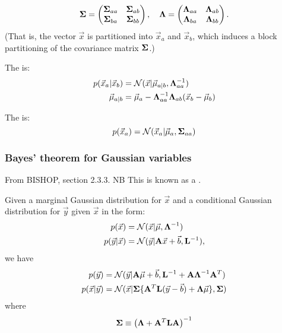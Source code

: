\documentclass[11pt]{article}
\begin{document}
\begin{appendices}
\begin{equation}
  \boldsymbol{\Sigma} =
  \left(
    \begin{matrix}
      \boldsymbol{\Sigma}_{aa} & \boldsymbol{\Sigma}_{ab} \\
      \boldsymbol{\Sigma}_{ba} & \boldsymbol{\Sigma}_{bb}
    \end{matrix}
  \right)
  , \quad
  \boldsymbol{\Lambda} =
  \left(
    \begin{matrix}
      \boldsymbol{\Lambda}_{aa} & \boldsymbol{\Lambda}_{ab} \\
      \boldsymbol{\Lambda}_{ba} & \boldsymbol{\Lambda}_{bb}
    \end{matrix}
  \right).
\end{equation}
(That is, the vector $\vec{x}$ is partitioned into $\vec{x}_a$ and $\vec{x}_b$, which
induces a block partitioning of the covariance matrix $\boldsymbol{\Sigma}$.)

The  is:
\begin{align}
  p(\vec{x}_a | \vec{x}_b) &= \mathcal{N}(\vec{x} | \vec{\mu}_{a | b},
                              \boldsymbol{\Lambda}_{aa}^{-1}) \\ 
  \vec{\mu}_{a | b}        &= \vec{\mu}_a - \boldsymbol{\Lambda}_{aa}^{-1} \boldsymbol{\Lambda}_{ab}
                              (\vec{x}_b - \vec{\mu}_b)   \label{eq:gauss_part_cond} 
\end{align}

The  is:
\begin{equation}
  p(\vec{x}_a) = \mathcal{N}(\vec{x}_a | \vec{\mu}_a,
  \boldsymbol{\Sigma}_{aa}) \label{eq:gauss_part_marg} 
\end{equation}

\subsubsection{Bayes' theorem for Gaussian variables}
From BISHOP, section 2.3.3. NB This is known as a .

Given a marginal Gaussian distribution for $\vec{x}$ and a conditional Gaussian
distribution for $\vec{y}$ given $\vec{x}$ in the form:
\begin{align}
  p(\vec{x})         &= \mathcal{N}(\vec{x} | \vec{\mu}, \boldsymbol{\Lambda}^{-1}) \\
  p(\vec{y}|\vec{x}) &= \mathcal{N}(\vec{y} | \mathbf{A} \vec{x} + \vec{b}, \mathbf{L}^{-1}),
\end{align}
we have
\begin{align}
  p(\vec{y})         &= \mathcal{N} (\vec{y} |\mathbf{A} \vec{\mu} + \vec{b}, \mathbf{L}^{-1}
                        + \mathbf{A} \boldsymbol{\Lambda}^{-1} \mathbf{A}^T )   \label{eq:gauss_bayes_marg} \\
  p(\vec{x}|\vec{y}) &= \mathcal{N} ( \vec{x} | \boldsymbol{\Sigma} \{ \mathbf{A}^T \mathbf{L}
                        (\vec{y} - \vec{b}) + \boldsymbol{\Lambda} \vec{\mu} \},
                       \boldsymbol{\Sigma})   \label{eq:gauss_bayes_cond} 
\end{align}
where
\begin{equation}
  \boldsymbol{\Sigma} \equiv \left(\boldsymbol{\Lambda} + \mathbf{A}^T \mathbf{L} \mathbf{A} \right)^{-1}
\end{equation}



\end{appendices}
\end{document}
